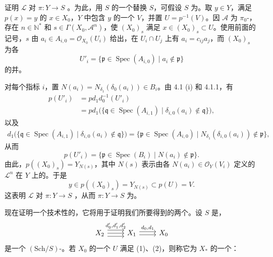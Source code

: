 证明 $\mathcal L$ 对 $\pi:Y\to S$ 。为此，用 $S$ 的一个替换 $S$，可假设 $S$ 为。取 $y\in Y$，满足 $p(x)=y$ 的 $x\in X_0$，$Y$ 中包含 $y$ 的一个 $V$，并置 $U=p^{-1}(V)$。因 $\mathcal A$ 为 $\pi_0$-，存在 $n\in\mathbb N^*$ 和 $s\in\Gamma(X_0,\mathcal A^n)$，使 $(X_0)_s$ 满足 $x\in(X_0)_s\subset U$。使用前面的记号，$s$ 由 $a_i\in A_{i,0}=\mathcal O_{X_0}(U_i)$ 给出，在 $U_i\cap U_j$ 上有 $a_i=c_{ij}a_j$，而 $(X_0)_s$ 为各
\[U'_i=\{\mathfrak p\in\operatorname{Spec}(A_{i,0})\mid a_i\notin\mathfrak p\}\]
的并。

对每个指标 $i$，置 $N(a_i)=N_{\delta_1}(\delta_0(a_i))\in B_i$。由 4.1 (i) 和 4.1.1，有
\[
\begin{aligned}
p(U'_i)&=pd_1d_0^{-1}(U'_i)\\
&=pd_1\bigl(\{\mathfrak q\in\operatorname{Spec}(A_{i,1})\mid\delta_{i,0}(a_i)\notin\mathfrak q\}\bigr),
\end{aligned}
\]
以及
\[
\begin{aligned}
d_1\bigl(\{\mathfrak q\in\operatorname{Spec}(A_{i,1})\mid\delta_{i,0}(a_i)\notin\mathfrak q\}\bigr)
=\{\mathfrak p\in\operatorname{Spec}(A_{i,0})\mid N_{\delta_1}(\delta_{i,0}(a_i))\notin\mathfrak p\},
\end{aligned}
\]
从而
\[p(U'_i)=\{\mathfrak p\in\operatorname{Spec}(B_i)\mid N(a_i)\notin\mathfrak p\}.\]
由此，$p((X_0)_s)=Y_{N(s)}$，其中 $N(s)$ 表示由各 $N(a_i)\in\mathcal O_Y(V_i)$ 定义的 $\mathcal L^n$ 在 $Y$ 上的。于是
\[y\in p((X_0)_s)=Y_{N(s)}\subset p(U)=V.\tag{*}\]
这表明 $\mathcal L$ 对 $\pi:Y\to S$ ，从而 $\pi:Y\to S$ 为。

现在证明一个技术性的，它将用于证明我们所要得到的两个。设 $S$ 是，
\[
\begin{tikzcd}
X_2\arrow[r,shift left=1ex,"{d'_0,d'_1,d'_2}"]\arrow[r]\arrow[r,shift right=1ex]&X_1\arrow[r,shift left=.5ex,"{d_0,d_1}"]\arrow[r,shift right=.5ex]&X_0
\end{tikzcd}
\]
是一个 $(\mathrm{Sch}/S)$-。若 $X_0$ 的一个 $U$ 满足 (1)、(2)，则称它为 $X_*$ 的一个：

